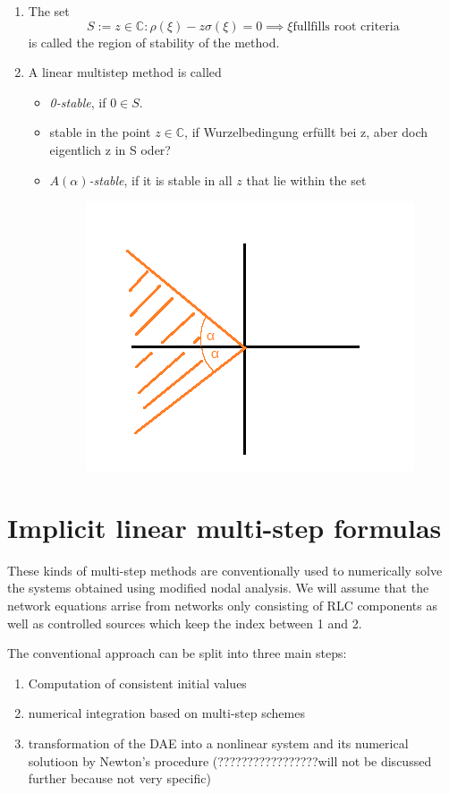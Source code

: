 	\begin{definition}
		\begin{enumerate}
			\item 
			The set
			\begin{equation}
				S := {z \in \mathbb{C} : \rho(\xi) - z \sigma(\xi) = 0 \implies \xi \text{fullfills root criteria}}
			\end{equation}
			is called the region of stability of the method.
			\item 
			A linear multistep method is called
			\begin{itemize}
				\item \emph{0-stable}, if $0 \in S$.
				\item stable in the point $z \in \mathbb{C}$, if Wurzelbedingung erfüllt bei z, aber doch eigentlich z in S oder?
				\item \emph{$A(\alpha)$-stable}, if it is stable in all $z$ that lie within the set
				 \begin{figure}[H]
				 	\centering
				 	\includegraphics[width=0.3\linewidth]{screenshot021}
				 	\caption{}
				 	\label{fig:screenshot021}
				 \end{figure}
				 
			\end{itemize}
		\end{enumerate}
	\end{definition}
	

\section{Implicit linear multi-step formulas}
These kinds of multi-step methods are conventionally used to numerically solve the systems obtained using modified nodal analysis. We will assume that the network equations arrise from networks only consisting of RLC components as well as controlled sources which keep the index between 1 and 2.

The conventional approach can be split into three main steps:
\begin{enumerate}
	\item Computation of consistent initial values
	\item numerical integration based on multi-step schemes
	\item transformation of the DAE into a nonlinear system and its numerical solutioon by Newton's procedure (?????????????????will not be discussed further because not very specific)
\end{enumerate}

